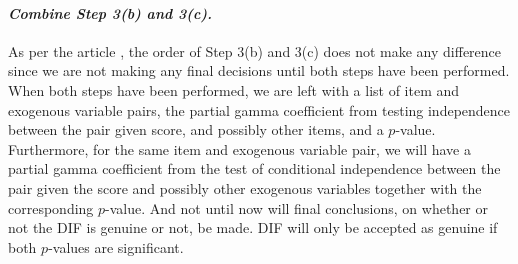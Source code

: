 \documentclass[a4project,12pt]{article}
\theoremstyle{examplestyle}
\theoremstyle{defstyle}
\theoremstyle{thmstyle}
\begin{document}
\paragraph{\textit{Combine Step 3(b) and 3(c).}} As per the article \cite{kreiner-christensen-2011}, the order of Step 3(b) and 3(c) does not make any difference since we are not making any final decisions until both steps have been performed. When both steps have been performed, we are left with a list of item and exogenous variable pairs, the partial gamma coefficient from testing independence between the pair given score, and possibly other items, and a $p$-value. Furthermore, for the same item and exogenous variable pair, we will have a partial gamma coefficient from the test of conditional independence between the pair given the score and possibly other exogenous variables together with the corresponding $p$-value. And not until now will final conclusions, on whether or not the DIF is genuine or not, be made. DIF will only be accepted as genuine if both $p$-values are significant.
\end{document}
